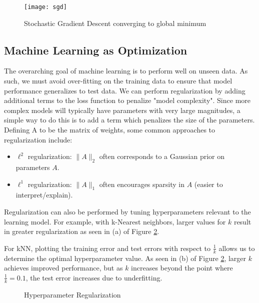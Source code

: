 \documentclass[twoside]{article}
\begin{document}
\begin{figure}[!ht]%
    \centering
    \texttt{[image: sgd]}
    \caption{Stochastic Gradient Descent converging to global minimum}
    \label{fig:sgd}%
\end{figure}

\subsection{Machine Learning as Optimization}

The overarching goal of machine learning is to perform well on unseen data. As such, we must avoid over-fitting on the training data to ensure that model performance generalizes to test data. We can perform regularization by adding additional terms to the loss function to penalize "model complexity". Since more complex models will typically have parameters with very large magnitudes, a simple way to do this is to add a term which penalizes the size of the parameters. Defining A to be the matrix of weights, some common approaches to regularization include: 

\begin{itemize}
\item $\ell^2$ regularization: $\|A\|_2$ often corresponds to a Gaussian prior on parameters $A$.

\item $\ell^1$ regularization: $\|A\|_1$ often encourages sparsity in $A$ (easier to interpret/explain).
\end{itemize}

Regularization can also be performed by tuning hyperparameters relevant to the learning model. For example, with k-Nearest neighbors, larger values for $k$ result in greater regularization as seen in (a) of Figure \ref{fig:hyper_parameters}.

For kNN, plotting the training error and test errors with respect to $\frac{1}{k}$ allows us to determine the optimal hyperparameter value. As seen in (b) of Figure \ref{fig:hyper_parameters}, larger $k$ achieves improved performance, but as $k$ increases beyond the point where $\frac{1}{k} = 0.1$, the test error increases due to underfitting.

\begin{figure}[!ht]%
    \centering
    \qquad
    \caption{Hyperparameter Regularization}%
    \label{fig:hyper_parameters}%
\end{figure}
\end{document}
